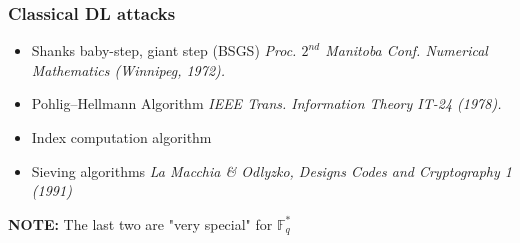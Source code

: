 \documentclass[10pt,handout]{beamer} %
\newcommand{\F}{\mathbb F}
\theoremstyle{definition}
\begin{document}
\begin{frame}
\frametitle{Classical DL attacks}


 \begin{itemize}[<+-| alert@+>]
\item[\textcolor{red}{\ding{44}}] Shanks \alert{baby-step,
giant step} (BSGS) \textit{Proc. $2^{nd}$ Manitoba Conf. Numerical
Mathematics (Winnipeg, 1972).}
\item[\textcolor{red}{\ding{44}}] Pohlig--Hellmann
Algorithm \textit{IEEE Trans. Information Theory IT-24
(1978).}
\item[\textcolor{red}{\ding{44}}] Index computation
algorithm
\item[\textcolor{red}{\ding{44}}] Sieving algorithms
\emph{La Macchia \& Odlyzko, Designs Codes and Cryptography 1 (1991)}
\end{itemize}\pause\bigskip


\textbf{NOTE:} The last two are "very special" for $\F_q^*$

\end{frame}
\end{document}
